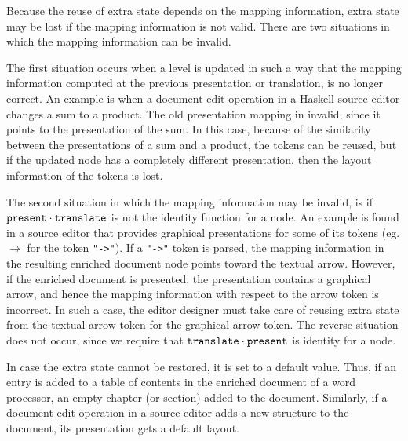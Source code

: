 Because the reuse of extra state depends on the mapping information, extra state may be lost if the mapping information is not valid. There are two situations in which the mapping information can be invalid.  

The first situation occurs when a level is updated in such a way that the mapping information computed at the previous presentation or translation, is no longer correct. An example is when a document edit operation in a Haskell source editor changes a sum to a product. The old presentation mapping in invalid, since it points to the presentation of the sum. In this case, because of the similarity between the presentations of a sum and a product, the tokens can be reused, but if the updated node has a completely different presentation, then the layout information of the tokens is lost. 

The second situation in which the mapping information may be invalid, is if 
${\tt present} \cdot {\tt translate}$ is not the identity function for a node.  An example is found in a source editor that provides graphical presentations for some of its tokens (eg. $\rightarrow$ for the token \verb|"->"|). If a \verb|"->"| token is parsed, the mapping information in the resulting enriched document node points toward the textual arrow. However, if the enriched document is presented, the presentation contains a graphical arrow, and hence the mapping information with respect to the arrow token is incorrect. In such a case, the editor designer must take care of reusing extra state from the textual arrow token for the graphical arrow token. The reverse situation does not occur, since we require that ${\tt translate} \cdot {\tt present}$ is identity for a node. 

In case the extra state cannot be restored, it is set to a default value. Thus, if an entry is added to a table of contents in the enriched document of a word processor, an empty chapter (or section) added to the document. Similarly, if a document edit operation in a source editor adds a new structure to the document, its presentation gets a default layout.

